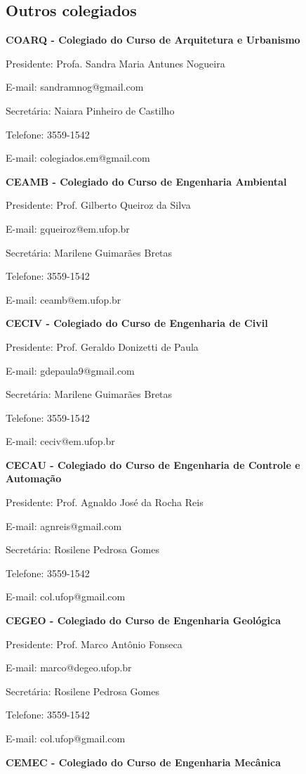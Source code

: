\subsection*{Outros colegiados}

\textbf{COARQ - Colegiado do Curso de Arquitetura e Urbanismo}

Presidente: Profa. Sandra Maria Antunes Nogueira

E-mail: sandramnog@gmail.com

Secretária: Naiara Pinheiro de Castilho

Telefone: 3559-1542

E-mail: colegiados.em@gmail.com


\textbf{CEAMB - Colegiado do Curso de Engenharia Ambiental}

Presidente: Prof. Gilberto Queiroz da Silva

E-mail: gqueiroz@em.ufop.br

Secretária: Marilene Guimarães Bretas

Telefone: 3559-1542

E-mail: ceamb@em.ufop.br

\textbf{CECIV - Colegiado do Curso de Engenharia de Civil}

Presidente: Prof. Geraldo Donizetti de Paula

E-mail: gdepaula9@gmail.com

Secretária: Marilene Guimarães Bretas

Telefone: 3559-1542

E-mail: ceciv@em.ufop.br

\textbf{CECAU - Colegiado do Curso de Engenharia de Controle e Automação}

Presidente: Prof. Agnaldo José da Rocha Reis

E-mail: agnreis@gmail.com

Secretária: Rosilene Pedrosa Gomes

Telefone: 3559-1542

E-mail: col.ufop@gmail.com

\textbf{CEGEO - Colegiado do Curso de Engenharia Geológica}

Presidente: Prof. Marco Antônio Fonseca

E-mail: marco@degeo.ufop.br

Secretária: Rosilene Pedrosa Gomes

Telefone: 3559-1542

E-mail: col.ufop@gmail.com

\textbf{CEMEC - Colegiado do Curso de Engenharia Mecânica}

